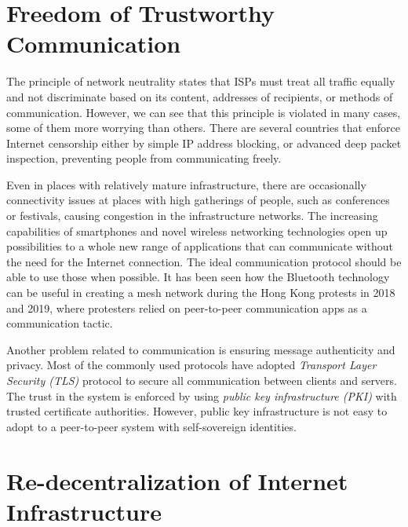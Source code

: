 

\section{Freedom of Trustworthy Communication}

The principle of network neutrality states that ISPs must treat all traffic equally and not discriminate based on its content, addresses of recipients, or methods of communication. However, we can see that this principle is violated in many cases, some of them more worrying than others. There are several countries that enforce Internet censorship either by simple IP address blocking, or advanced deep packet inspection, preventing people from communicating freely.

Even in places with relatively mature infrastructure, there are occasionally connectivity issues at places with high gatherings of people, such as conferences or festivals, causing congestion in the infrastructure networks. The increasing capabilities of smartphones and novel wireless networking technologies open up possibilities to a whole new range of applications that can communicate without the need for the Internet connection. The ideal communication protocol should be able to use those when possible. It has been seen how the Bluetooth technology can be useful in creating a mesh network during the Hong Kong protests in 2018 and 2019, where protesters relied on peer-to-peer communication apps as a communication tactic.

Another problem related to communication is ensuring message authenticity and privacy. Most of the commonly used protocols have adopted \textit{Transport Layer Security (TLS)} protocol to secure all communication between clients and servers. The trust in the system is enforced by using \textit{public key infrastructure (PKI)} with trusted certificate authorities. However, public key infrastructure is not easy to adopt to a peer-to-peer system with self-sovereign identities.

\section{Re-decentralization of Internet Infrastructure}

